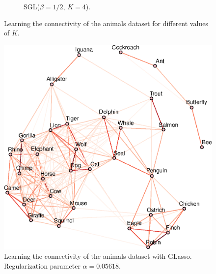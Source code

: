 \begin{figure}[!htb]
\begin{subfigure}[b]{0.475\textwidth}
      \caption{\textsf{SGL}($\beta = 1/2$, $K = 4$).}
    \end{subfigure}
    \caption{Learning the connectivity of the \textsf{animals} dataset for different values of $K$.}
    \label{fig:animals}
\end{figure}

\begin{figure}
  \centering
  \includegraphics[width=.475\textwidth]{animals/latex/figures/animals_glasso.eps}
  \caption{Learning the connectivity of the \textsf{animals} dataset with \textsf{GLasso}.
           Regularization parameter $\alpha = 0.05618$.}
  \label{fig:animals-glasso}
\end{figure}
